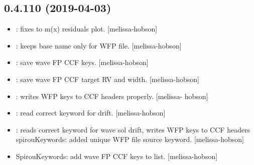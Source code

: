 \documentclass[a4paper,10pt,english]{report}
\begin{document}
\subsection{0.4.110 (2019-04-03)}
\label{\detokenize{misc/changelog:id153}}\begin{itemize}
\item {} 
: fixes to m(x) residuals plot. {[}melissa-hobson{]}

\item {} 
: keeps base name only for WFP file. {[}melissa-hobson{]}

\item {} 
: save wave FP CCF keys. {[}melissa-hobson{]}

\item {} 
: save wave FP CCF target RV and width. {[}melissa-hobson{]}

\item {} 
: writes WFP keys to CCF headers properly. {[}melissa-
hobson{]}

\item {} 
: read correct keyword for drift. {[}melissa-hobson{]}

\item {} 
: reads correct keyword for wave sol drift, writes WFP
keys to CCF headers spirouKeywords: added unique WFP file source
keyword. {[}melissa-hobson{]}

\item {} 
SpirouKeywords: add wave FP CCF keys to list. {[}melissa-hobson{]}

\end{itemize}
\end{document}
